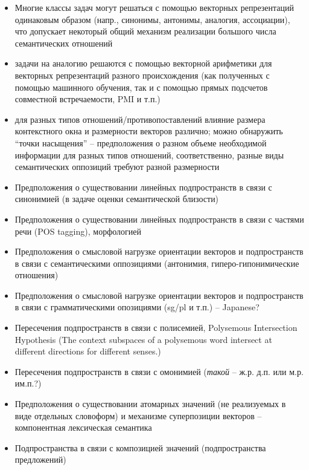 \documentclass[10pt]{article}
\theoremstyle{example-style}
\begin{document}
\begin{itemize}
  \item Многие классы задач могут решаться с помощью векторных репрезентаций одинаковым образом (напр., синонимы, антонимы, аналогия, ассоциации), что допускает некоторый общий механизм реализации большого числа семантических отношений~\autocite{turney2008uniform}
  \item задачи на аналогию решаются с помощью векторной арифметики для векторных репрезентаций разного происхождения (как полученных с помощью машинного обучения, так и с помощью прямых подсчетов совместной встречаемости, PMI и т.п.)
  \item для разных типов отношений/противопоставлений влияние размера контекстного окна и размерности векторов различно; можно обнаружить ``точки насыщения'' -- предположения о разном объеме необходимой информации для разных типов отношений, соответственно, разные виды семантических оппозиций требуют разной размерности~\autocite{gladkova2016analogy}
  \item Предположения о существовании линейных подпространств в связи с синонимией (в задаче оценки семантической близости)
  \item Предположения о существовании линейных подпространств в связи с частями речи (POS tagging), морфологией~\autocite{cotterell2015morphological, soricut2015unsupervised}
  \item Предположения о смысловой нагрузке ориентации векторов и подпространств в связи с семантическими оппозициями (антонимия, гиперо-гипонимические отношения)
  \item Предположения о смысловой нагрузке ориентации векторов и подпространств в связи с грамматическими опозициями (sg/pl и т.п.) -- Japanese?
  \item Пересечения подпространств в связи с полисемией, Polysemous Intersection Hypothesis (The context subspaces of a polysemous word intersect at  different directions for  different senses.)~\autocite{mu2016geometry, mu2017representing}
  \item Пересечения подпространств в связи с омонимией (\textit{такой} -- ж.р. д.п. или м.р. им.п.?)
  \item Предположения о существовании атомарных значений (не реализуемых в виде отдельных словоформ) и механизме суперпозиции векторов -- компонентная лексическая семантика~\autocite{arora2016linear}
  \item Подпространства в связи с композицией значений (подпространства предложений)~\autocite{mu2017representing}

\end{itemize}
\end{document}
